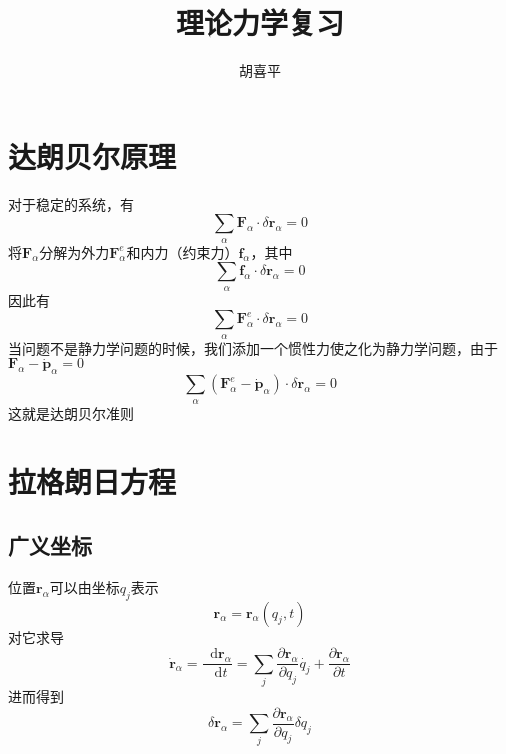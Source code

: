 \documentclass{article}
\author{胡喜平}
\title{理论力学复习}
\newcommand*{\dif}{\mathop{}\!\mathrm{d}}
\begin{document}
\maketitle

\section{达朗贝尔原理}

对于稳定的系统，有
\begin{equation}
  \sum\limits_{\alpha} \mathbf{F}_{\alpha} \cdot \delta \mathbf{r}_{\alpha} = 0
\end{equation}
将$\mathbf{F}_{\alpha}$分解为外力$\mathbf{F}_{\alpha}^{e}$和内力（约束力）$\mathbf{f}_{\alpha}$，其中
\begin{equation}
  \sum\limits_{\alpha} \mathbf{f}_{\alpha} \cdot \delta \mathbf{r}_{\alpha} = 0
\end{equation}
因此有
\begin{equation}
  \sum\limits_{\alpha} \mathbf{F}_{\alpha}^{e} \cdot \delta \mathbf{r}_{\alpha} = 0
\end{equation}
当问题不是静力学问题的时候，我们添加一个惯性力使之化为静力学问题，由于$\mathbf{F}_{\alpha} - \dot{\mathbf{p}}_{\alpha} = 0$
\begin{equation}
  \label{eq:0}
  \sum\limits_{\alpha}\left(\mathbf{F}_{\alpha}^{e} - \dot{\mathbf{p}}_{\alpha} \right) \cdot \delta \mathbf{r}_{\alpha} = 0
\end{equation}
这就是达朗贝尔准则

\section{拉格朗日方程}

\subsection{广义坐标}
位置$\mathbf{r}_{\alpha}$可以由坐标$q_{j}$表示
\begin{equation}
  \label{eq:5}
  \mathbf{r}_{\alpha} = \mathbf{r}_{\alpha} \left( q_{j},t \right)
\end{equation}
对它求导
\begin{equation}
  \label{eq:6}
  \dot{\mathbf{r}}_{\alpha} = \frac{\dif \mathbf{r}_{\alpha}}{\dif t} = \sum\limits_{j} \frac{\partial \mathbf{r}_{\alpha}}{\partial q_{j}} \dot{q_{j}} + \frac{\partial \mathbf{r}_{\alpha}}{\partial t}
\end{equation}
进而得到
\begin{equation}
  \label{eq:1}
  \delta \mathbf{r}_{\alpha}= \sum\limits_{j} \frac{\partial \mathbf{r}_{\alpha}}{\partial q_{j}} \delta q_{j}
\end{equation}
\end{document}
